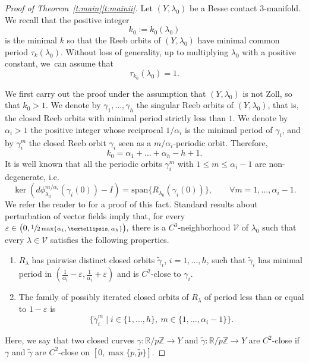 \documentclass[10pt,a4paper]{amsart}
\providecommand{\ie}{i.e.\ }
\let\mathds\mathbb
\let\epsilon\varepsilon
\newenvironment{enumeratei}
{\bgroup\def\theenumi{\roman{enumi}}\def\theenumii{\arabic{enumii}}\begin{enumerate}}
{\end{enumerate}\egroup}
\theoremstyle{definition}
\newcommand{\Z}{\mathds{Z}}
\newcommand{\R}{\mathds{R}}
\newcommand{\VV}{\mathcal{V}}
\let\diff d
\providecommand{\ie}{i.e. }
\begin{document}
\begin{proof}[Proof of Theorem~\ref{t:main}\eqref{t:mainii}]
Let $(Y,\lambda_0)$ be a Besse contact $3$-manifold. We recall that the positive integer\vspace*{-3pt}
\[
k_0:=k_0(\lambda_0)
\]
is the minimal $k$ so that the Reeb orbits of $(Y,\lambda_0)$ have minimal common period $\tau_k(\lambda_0)$. Without loss of generality, up to multiplying $\lambda_0$ with a positive constant, we~can assume that\vspace*{-3pt}
\[
\tau_{k_0}(\lambda_0)=1.
\]

We first carry out the proof under the assumption that $(Y,\lambda_0)$ is not Zoll, so that $k_0>1$. We denote by $\gamma_1,\dots,\gamma_h$ the singular Reeb orbits of $(Y,\lambda_0)$, that is, the closed Reeb orbits with minimal period strictly less than $1$.
We denote by $\alpha_i>1$ the positive integer whose reciprocal $1/\alpha_i$ is the minimal period of $\gamma_i$,
and by $\gamma_i^m$ the closed Reeb orbit $\gamma_i$ seen as a $m/\alpha_i$-periodic orbit. Therefore,\vspace*{-3pt}
\begin{equation}
\label{e:k_nonZoll}
k_0 = \alpha_1+\dots+\alpha_h - h + 1.
\end{equation}
It is well known that all the periodic orbits $\gamma_i^m$ with $1\leq m\leq \alpha_i-1$ are non-degenerate, \ie\vspace*{-3pt}
\[
\ker(\diff\phi_{\lambda_0}^{m/\alpha_i}(\gamma_i(0))-I)=\mathrm{span}\{R_{\lambda_0}(\gamma_i(0))\},\qquad\forall m=1,\dots,\alpha_i-1.
\]
We refer the reader to \cite[\S 4.1]{Cristofaro-Gardiner:2020aa} for a proof of this fact.
Standard results about perturbation of vector fields imply that, for every
$
\epsilon\in\big(0,\sfrac1{2\max\{\alpha_1,\dots,\alpha_h\}}\big),
$
there is a $C^3$-neighborhood $\VV$ of $\lambda_0$ such that every $\lambda\in\VV$ satisfies the following properties.

\begin{enumeratei}
\item\label{enum2:i}
$R_{\lambda}$ has pairwise distinct closed orbits $\tilde\gamma_i$, $i=1,\dots,h$, such that $\tilde{\gamma}_i$ has minimal period in $(\tfrac1{\alpha_i}-\epsilon,\tfrac1{\alpha_i}+\epsilon)$ and is $C^2$-close to $\gamma_i$.
\item\label{enum2:ii}
The family of possibly iterated closed orbits of $R_{\lambda}$ of period less than or equal to $1-\epsilon$ is
\[
\big\{ \tilde\gamma_i^m\mid i\in\{1,\dots,h\},\ m\in\{1,\dots,\alpha_i-1\} \big\}.
\]
\end{enumeratei}
Here, we say that two closed curves $\gamma:\R/p\Z \to Y$ and $\tilde{\gamma}:\R/\tilde{p} \Z \to Y$ are $C^2$-close if $\gamma$ and $\tilde{\gamma}$ are $C^2$-close on $[0,\max\{p,\tilde{p}\}]$.


\end{proof}
\end{document}
